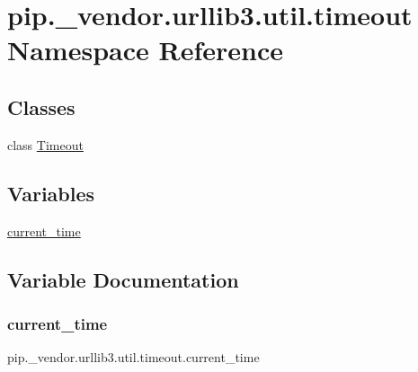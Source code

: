 \hypertarget{namespacepip_1_1__vendor_1_1urllib3_1_1util_1_1timeout}{}\section{pip.\+\_\+vendor.\+urllib3.\+util.\+timeout Namespace Reference}
\label{namespacepip_1_1__vendor_1_1urllib3_1_1util_1_1timeout}
\subsection*{Classes}
\begin{DoxyCompactItemize}
\item 
class \hyperlink{classpip_1_1__vendor_1_1urllib3_1_1util_1_1timeout_1_1Timeout}{Timeout}
\end{DoxyCompactItemize}
\subsection*{Variables}
\begin{DoxyCompactItemize}
\item 
\hyperlink{namespacepip_1_1__vendor_1_1urllib3_1_1util_1_1timeout_ad7cda35632120ef7b22c6c2cb2cd9402}{current\+\_\+time}
\end{DoxyCompactItemize}


\subsection{Variable Documentation}
\mbox{\label{namespacepip_1_1__vendor_1_1urllib3_1_1util_1_1timeout_ad7cda35632120ef7b22c6c2cb2cd9402}} 
\subsubsection{\texorpdfstring{current\+\_\+time}{current\_time}}
{\footnotesize\ttfamily pip.\+\_\+vendor.\+urllib3.\+util.\+timeout.\+current\+\_\+time}


